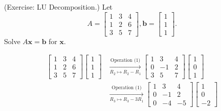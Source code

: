 \documentclass[letterpaper]{article}
\newcommand{\0}{\mathbf{0}}
\renewcommand{\b}{\mathbf{b}}
\newcommand{\x}{\mathbf{x}}
\begin{document}
\begin{mdframed}
    (Exercise: LU Decomposition.) Let \[A = \begin{bmatrix}
        1 & 3 & 4 \\ 1 & 2 & 6 \\ 3 & 5 & 7
    \end{bmatrix}, \b = \begin{bmatrix}
        1 \\ 1 \\ 1
    \end{bmatrix}.\] Solve $A\x = \b$ for $\x$. 

    \begin{mdframed}
        \begin{equation*}
            \begin{aligned}
                \begin{bmatrix}
                    1 & 3 & 4 \\ 
                    1 & 2 & 6 \\ 
                    3 & 5 & 7
                \end{bmatrix} \begin{bmatrix}
                    1 \\ 1 \\ 1 
                \end{bmatrix} &\xrightarrow[R_2 \mapsto R_2 - R_1]{\text{Operation (1)}} \begin{bmatrix}
                    1 & 3 & 4 \\ 
                    0 & -1 & 2 \\ 
                    3 & 5 & 7
                \end{bmatrix} \begin{bmatrix}
                    1 \\ 0 \\ 1 
                \end{bmatrix} \\ 
                    &\xrightarrow[R_3 \mapsto R_3 - 3R_1]{\text{Operation (1)}} \begin{bmatrix}
                        1 & 3 & 4 \\ 
                        0 & -1 & 2 \\ 
                        0 & -4 & -5
                    \end{bmatrix} \begin{bmatrix}
                        1 \\ 0 \\ -2 

\end{bmatrix}
\end{aligned}
\end{equation*}
\end{mdframed}
\end{mdframed}
\end{document}
